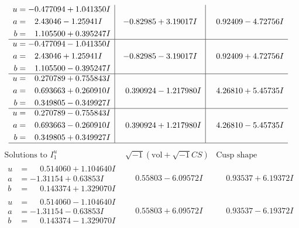 \documentclass[1p]{elsarticle_modified}
\theoremstyle{definition}
\newcommand{\I}{\sqrt{-1}}
\begin{document}
$$\begin{array}{c|c|c}
\begin{aligned}
u &= -0.477094 + 1.041350 I \\
a &= \phantom{-}2.43046 - 1.25941 I \\
b &= \phantom{-}1.105500 + 0.395247 I\end{aligned}
 & -0.82985 + 3.19017 I & \phantom{-}0.92409 - 4.72756 I \\ \hline\begin{aligned}
u &= -0.477094 - 1.041350 I \\
a &= \phantom{-}2.43046 + 1.25941 I \\
b &= \phantom{-}1.105500 - 0.395247 I\end{aligned}
 & -0.82985 - 3.19017 I & \phantom{-}0.92409 + 4.72756 I \\ \hline\begin{aligned}
u &= \phantom{-}0.270789 + 0.755843 I \\
a &= \phantom{-}0.693663 + 0.260910 I \\
b &= \phantom{-}0.349805 - 0.349927 I\end{aligned}
 & \phantom{-}0.390924 - 1.217980 I & \phantom{-}4.26810 + 5.45735 I \\ \hline\begin{aligned}
u &= \phantom{-}0.270789 - 0.755843 I \\
a &= \phantom{-}0.693663 - 0.260910 I \\
b &= \phantom{-}0.349805 + 0.349927 I\end{aligned}
 & \phantom{-}0.390924 + 1.217980 I & \phantom{-}4.26810 - 5.45735 I\\
 \hline 
 \end{array}$$\newpage$$\begin{array}{c|c|c}  
\text{Solutions to }I^u_{1}& \I (\text{vol} + \sqrt{-1}CS) & \text{Cusp shape}\\
 \hline 
\begin{aligned}
u &= \phantom{-}0.514060 + 1.104640 I \\
a &= -1.31154 + 0.63853 I \\
b &= \phantom{-}0.143374 + 1.329070 I\end{aligned}
 & \phantom{-}0.55803 - 6.09572 I & \phantom{-}0.93537 + 6.19372 I \\ \hline\begin{aligned}
u &= \phantom{-}0.514060 - 1.104640 I \\
a &= -1.31154 - 0.63853 I \\
b &= \phantom{-}0.143374 - 1.329070 I\end{aligned}
 & \phantom{-}0.55803 + 6.09572 I & \phantom{-}0.93537 - 6.19372 I \\ \hline\begin{aligned}

\end{aligned}
\end{array}$$
\end{document}
